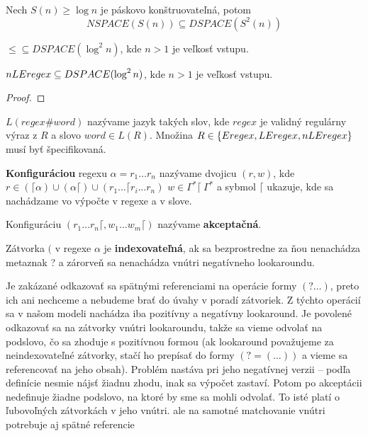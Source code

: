 \begin{veta}[Savitch]
Nech $S(n)\geq \log n$ je páskovo konštruovateľná, potom 
$$ NSPACE(S(n)) \subseteq DSPACE(S^2(n)) $$
\end{veta}

\begin{dosledok}
$\le \subseteq DSPACE(\log^2 n)$, kde $n>1$ je veľkosť vstupu.
\end{dosledok}

\begin{veta}
$nLEregex \subseteq DSPACE(\log^2 n)$, kde $n>1$ je veľkosť vstupu.
\end{veta}
\begin{proof}
\TODO
\end{proof}

\begin{df}
$L(regex\#word)$ nazývame jazyk takých slov, kde $regex$ je validný regulárny výraz z $R$ a slovo $word \in L(R)$. Množina $R \in \lbrace Eregex, LEregex, nLEregex \rbrace$ musí byť špecifikovaná.
\end{df}

\begin{df}
\textbf{Konfiguráciou} regexu $\alpha = r_1 \dots r_n$ nazývame dvojicu $(r, w)$, kde $r \in (\lceil\alpha)\cup(\alpha\lceil)\cup(r_1 \dots \lceil r_i \dots r_n)$ $w \in \Gamma^*\lceil~ \Gamma^*$ a sybmol $\lceil$ ukazuje, kde sa nachádzame vo výpočte v regexe a v slove.
\end{df}

\begin{df}
Konfiguráciu $(r_1 \dots r_n \lceil, w_1\dots w_m \lceil)$ nazývame \textbf{akceptačná}.
\end{df}

\begin{df}
Zátvorka $($ v regexe $\alpha$ je \textbf{indexovateľná}, ak sa bezprostredne za ňou nenachádza metaznak ? a zárorveň sa nenachádza vnútri negatívneho lookaroundu.
\end{df}
Je zakázané odkazovať sa spätnými referenciami na operácie formy $(?\dots )$, preto ich ani nechceme a nebudeme brať do úvahy v poradí zátvoriek. Z týchto operácií sa v našom modeli nachádza iba pozitívny a negatívny lookaround. Je povolené odkazovať sa na zátvorky vnútri lookaroundu, takže sa vieme odvolať na podslovo, čo sa zhoduje s pozitívnou formou (ak lookaround považujeme za neindexovateľné zátvorky, stačí ho prepísať do formy $(?=(\dots ))$ a vieme sa referencovať na jeho obsah). Problém nastáva pri jeho negatívnej verzii -- podľa definície nesmie nájsť žiadnu zhodu, inak sa výpočet zastaví. Potom po akceptácii nedefinuje žiadne podslovo, na ktoré by sme sa mohli odvolať. To isté platí o ľubovoľných zátvorkách v jeho vnútri.
\TODO ale na samotné matchovanie vnútri potrebuje aj spätné referencie

